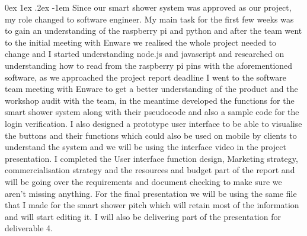 \documentclass[12pt, a4paper]{article}
\makeatletter
\renewcommand\paragraph{\@startsection{paragraph}{5}{\parindent}%
  {0ex \@plus1ex \@minus.2ex}%
  {-1em}%
  {\normalfont\normalsize\bfseries}}
\makeatother
\begin{document}
                \paragraph{}
                    Since our smart shower system was approved as our project, my role changed to software engineer. My main task for the first few weeks was to gain 
                    an understanding of the raspberry pi and python and after the team went to the initial meeting with Enware we realised the whole project needed 
                    to change and I started understanding node.js and javascript and researched on understanding how to read from the raspberry pi pins with the 
                    aforementioned software, as we approached the project report deadline I went to the software team meeting with Enware to get a better understanding 
                    of the product and the workshop audit with the team, in the meantime developed the functions for the smart shower system along with their pseudocode 
                    and also a sample code for the login verification. I also designed a prototype user interface to be able to visualise the buttons and their functions 
                    which could also be used on mobile by clients to understand the system and we will be using the interface video in the project presentation. I 
                    completed the User interface function design, Marketing strategy, commercialisation strategy and the resources and budget part of the report and 
                    will be going over the requirements and document checking to make sure we aren’t missing anything. For the final presentation we will be using the 
                    same file that I made for the smart shower pitch which will retain most of the information and will start editing it. I will also be delivering part 
                    of the presentation for deliverable 4.
\end{document}
